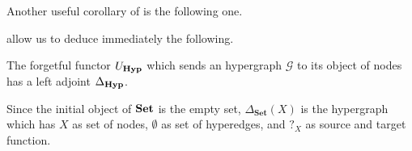 \documentclass[a4paper,UKenglish,cleveref,pdftex,thm-restate,numberwithinsect]{lipics-v2021}
\newcommand{\Set}{\mathbf{Set}}
\newcommand{\catname}[1]{\textbf{\textup{#1}}}
\newcommand{\hyp}{\catname{Hyp}}
\begin{document}
Another useful corollary of  is the following one.


 allow us to deduce immediately the following.

\begin{proposition}\label{cor:left}  The forgetful functor $U_{\hyp}$ which sends an hypergraph $\mathcal{G}$ to its object of nodes has a left adjoint $\Delta_{\hyp}$.
\end{proposition}

\begin{example}Since the initial object of $\catname{Set}$ is the empty set,  $\Delta_{\Set}(X)$ is the hypergraph which has $X$ as set of nodes, $\emptyset$ as set of hyperedges, and $?_X$ as source and target function.
\end{example}

\end{document}
